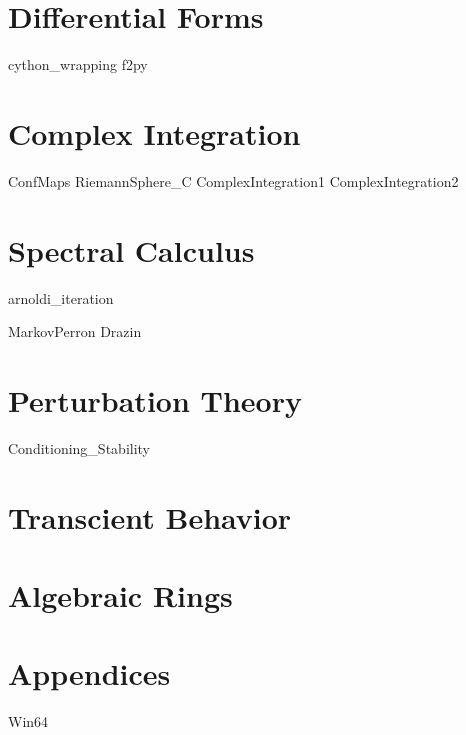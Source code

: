 \documentclass[nociteref]{newsiambook}
\begin{document}
\part{Differential Forms}
{cython_wrapping}
{f2py}

\part{Complex Integration}
{ConfMaps}
{RiemannSphere_C}
{ComplexIntegration1}
{ComplexIntegration2}

\part{Spectral Calculus}
{arnoldi_iteration}

{MarkovPerron}
{Drazin}

\part{Perturbation Theory}
{Conditioning_Stability}

\part{Transcient Behavior}

\part{Algebraic Rings}

\part{Appendices}
{Win64}
\end{document}
